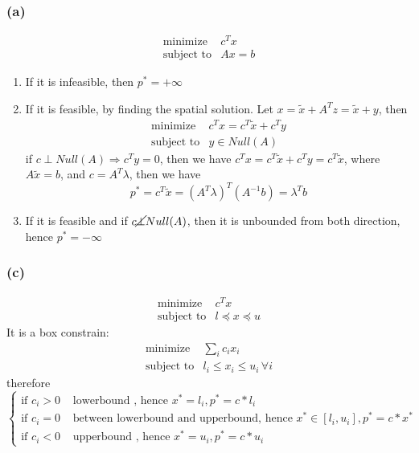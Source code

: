 \documentclass{article}
\begin{document}
     \subsubsection*{(a)}
\[    \begin{array}{ll}
    \mbox{minimize}   & c^Tx \\
    \mbox{subject to} & Ax = b
        \end{array}
  \]    
  \begin{enumerate}
	\item If it is infeasible, then $p^* = + \infty$
	\item If it is feasible, by finding the spatial solution. Let $x   = \tilde{x}+ A^Tz = \tilde{x} + y$, then 
	\[    \begin{array}{ll}
    \mbox{minimize}   & c^Tx = c^T \tilde{x}  + c^Ty \\
    \mbox{subject to} & y \in Null (A)
        \end{array}
  \]    
   if $ c \perp Null (A) \Rightarrow c^Ty = 0$, then we have $c^Tx = c^T \tilde{x}  +  c^Ty = c^T \tilde{x}$, where $A\tilde{x} = b$, and $c = A^T\lambda$, then we have  \[p^* = c^T \tilde{x} = (A^T\lambda)^T(A^{-1}b) = \lambda^Tb \]
	\item If it is feasible and if $c \cancel{\perp} Null (A)$, then it is unbounded from both direction, hence $p^* = -\infty$
\end{enumerate}
  
  
    \subsubsection*{(c)}
    \[    \begin{array}{ll}
    \mbox{minimize}   & c^Tx \\
    \mbox{subject to} & l \preceq x  \preceq u 
        \end{array}
  \]    
It is a box constrain:
  \[    \begin{array}{ll}
    \mbox{minimize}   & \sum_{i} c_i x_i \\
    \mbox{subject to} &l_i \le x_i \le u_i \, \forall i
        \end{array}
  \]     
  therefore 
  \[ 
 \begin{cases}
       \mbox{if } c_i > 0 & \mbox{ lowerbound , hence } x^* = l_i,  p^* = c*l_i\\
         \mbox{if } c_i = 0 & \mbox{ between lowerbound and upperbound, hence } x^* \in [l_i, u_i],   p^* = c*x^*\\
           \mbox{if } c_i <  0 & \mbox{ upperbound  , hence } x^* = u_i,  p^* = c*u_i
             \end{cases}
             \]
\end{document}
